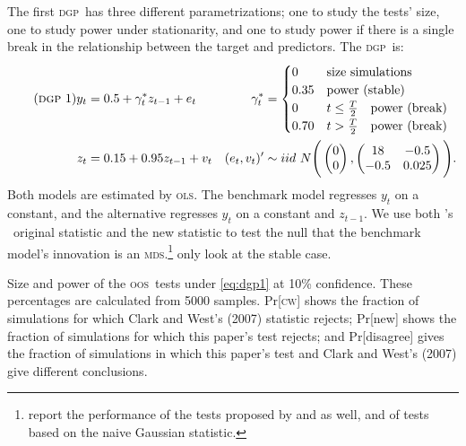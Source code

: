 \documentclass[12pt,fleqn]{article}
\newcommand\poscw{\citeauthor{ClW:06}'s \citeyearpar{ClW:06,ClW:07}}
\theoremstyle{definition}
\newcommand{\dgp}{\textsc{dgp}}
\newcommand{\mds}{\textsc{mds}}
\newcommand{\ols}{\textsc{ols}}
\newcommand{\oos}{\textsc{oos}}
\begin{document}
The first \dgp\ has three different parametrizations; one to study the
tests' size, one to study power under stationarity, and one to study
power if there is a single break in the relationship between the
target and predictors.  The \dgp\ is:
\begin{align}\label{eq:dgp1}\tag{\dgp\ 1}
  y_t &= 0.5 + \gamma^{*}_t z_{t-1} + e_t &
  \gamma^{*}_t &=
  \begin{cases}
    0    & \text{size simulations} \\
    0.35 & \text{power (stable)} \\
    0    & t \leq \tfrac{T}{2} \quad \text{power (break)} \\
    0.70 & t > \tfrac{T}{2} \quad \text{power (break)}
  \end{cases}\\\nonumber
  z_t &= 0.15 + 0.95 z_{t-1} + v_t &
  (e_t, v_t)' &\sim iid\ N\Bigg(\begin{pmatrix} 0 \\ 0
  \end{pmatrix}
   , \begin{pmatrix} 18 & -
    0.5 \\ -0.5 & 0.025 \end{pmatrix}\Bigg).
\end{align}
Both models are estimated by \ols. The benchmark model regresses $y_t$
on a constant, and the alternative regresses $y_t$ on a constant and
$z_{t-1}$.  We use both \poscw\ original statistic and the new
statistic to test the null that the benchmark model's innovation is an
\mds.\footnote{\citet{ClW:07} report the performance of the tests
  proposed by \citet{CCS:01} and \citet{ClM:05} as well, and of tests
  based on the naive Gaussian statistic.}  \citet{ClW:06,ClW:07} only
look at the stable case.

\begin{table}[tb]
  \centering
  
\caption{Size and power of the \oos\ tests under \eqref{eq:dgp1} at
  10\% confidence.  These percentages are calculated from 5000
  samples.  Pr[\textsc{cw}] shows the fraction of simulations for which Clark
  and West's (2007) statistic rejects; Pr[new] shows the fraction of
  simulations for which this paper's test rejects; and Pr[disagree]
  gives the fraction of simulations in which this paper's test and
  Clark and West's (2007) give different conclusions.}
\label{tab:mc1}
\end{table}
\end{document}
